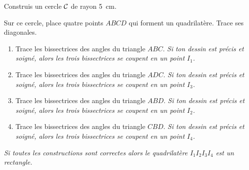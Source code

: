 \begin{myenumerate}
  \item Construis un cercle $\cal C$ de rayon 5~cm.
  \item Sur ce cercle, place quatre points $ABCD$ qui forment un
quadrilatère. Trace ses diagonales.
  \item
    \begin{enumerate}
    \item Trace les bissectrices des angles du triangle $ABC$. {\em Si
ton dessin est précis et soigné, alors les trois bissectrices se
coupent en un point $I_1$.}
    \item Trace les bissectrices des angles du triangle $ADC$. {\em Si
ton dessin est précis et soigné, alors les trois bissectrices se
coupent en un point $I_3$.}
    \item Trace les bissectrices des angles du triangle $ABD$. {\em Si
ton dessin est précis et soigné, alors les trois bissectrices se
coupent en un point $I_2$.}
    \item Trace les bissectrices des angles du triangle $CBD$. {\em Si
ton dessin est précis et soigné, alors les trois bissectrices se
coupent en un point $I_4$.}
    \end{enumerate}
\end{myenumerate}
{\em Si toutes les constructions sont correctes alors le quadrilatère
$I_1I_2I_3I_4$ est un rectangle.}
